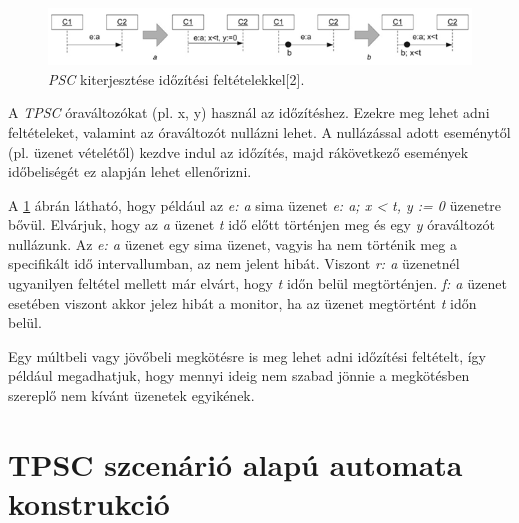 \begin{figure}[!ht]
    \centering
    \includegraphics[width=150mm, keepaspectratio]{figures/4abra.png}
    \caption{\textit{PSC} kiterjesztése időzítési feltételekkel[2].}
    \label{psc_clock_improvement}
\end{figure}

A \textit{TPSC} óraváltozókat (pl. x, y) használ az időzítéshez.
Ezekre meg lehet adni feltételeket, valamint az óraváltozót nullázni lehet.
A nullázással adott eseménytől (pl. üzenet vételétől) kezdve indul az időzítés, majd rákövetkező események időbeliségét ez alapján lehet ellenőrizni.

A \ref{psc_clock_improvement} ábrán látható, hogy például az \textit{e: a} sima üzenet \textit{e: a; x < t, y := 0} üzenetre bővül.
Elvárjuk, hogy az \textit{a} üzenet \textit{t} idő előtt történjen meg és egy \textit{y} óraváltozót nullázunk.
Az \textit{e: a} üzenet egy sima üzenet, vagyis ha nem történik meg a specifikált idő intervallumban, az nem jelent hibát.
Viszont \textit{r: a} üzenetnél ugyanilyen feltétel mellett már elvárt, hogy \textit{t} időn belül megtörténjen. \textit{f: a} üzenet esetében viszont akkor jelez hibát a monitor, ha az üzenet megtörtént \textit{t} időn belül.

Egy múltbeli vagy jövőbeli megkötésre is meg lehet adni időzítési feltételt, így például megadhatjuk, hogy mennyi ideig nem szabad jönnie a megkötésben szereplő nem kívánt üzenetek egyikének.

\clearpage\section{TPSC szcenárió alapú automata konstrukció}

